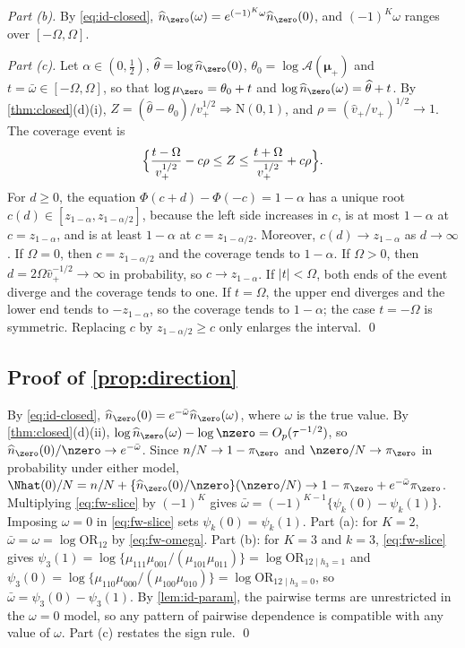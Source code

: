 \emph{Part (b).} By \eqref{eq:id-closed}, $\widehat n_{\zero}(\omega)=e^{(-1)^K\omega}\widehat n_{\zero}(0)$, and $(-1)^K\omega$ ranges over $[-\Omega,\Omega]$.

\emph{Part (c).} Let $\alpha\in(0,\tfrac12)$, $\widehat\theta=\log\widehat n_{\zero}(0)$, $\theta_0=\log\mathcal A(\bm\mu_+)$ and $t=\bar\omega\in[-\Omega,\Omega]$, so that $\log\mu_{\zero}=\theta_0+t$ and $\log\widehat n_{\zero}(\omega)=\widehat\theta+t$. By \cref{thm:closed}(d)(i), $Z=(\widehat\theta-\theta_0)/v_+^{1/2}\Rightarrow\mathrm N(0,1)$, and $\rho=(\widehat v_+/v_+)^{1/2}\to1$. The coverage event is
\[
  \Bigl\{\frac{t-\Omega}{v_+^{1/2}}-c\rho\le Z\le\frac{t+\Omega}{v_+^{1/2}}+c\rho\Bigr\}.
\]
For $d\ge0$, the equation $\Phi(c+d)-\Phi(-c)=1-\alpha$ has a unique root $c(d)\in[z_{1-\alpha},z_{1-\alpha/2}]$, because the left side increases in $c$, is at most $1-\alpha$ at $c=z_{1-\alpha}$, and is at least $1-\alpha$ at $c=z_{1-\alpha/2}$. Moreover, $c(d)\to z_{1-\alpha}$ as $d\to\infty$. If $\Omega=0$, then $c=z_{1-\alpha/2}$ and the coverage tends to $1-\alpha$. If $\Omega>0$, then $d=2\Omega\widehat v_+^{-1/2}\to\infty$ in probability, so $c\to z_{1-\alpha}$. If $|t|<\Omega$, both ends of the event diverge and the coverage tends to one. If $t=\Omega$, the upper end diverges and the lower end tends to $-z_{1-\alpha}$, so the coverage tends to $1-\alpha$; the case $t=-\Omega$ is symmetric. Replacing $c$ by $z_{1-\alpha/2}\ge c$ only enlarges the interval. \qed

\subsection{Proof of \texorpdfstring{\cref{prop:direction}}{the direction-of-bias proposition}}\label{app:id-direction}

By \eqref{eq:id-closed}, $\widehat n_{\zero}(0)=e^{-\bar\omega}\widehat n_{\zero}(\omega)$, where $\omega$ is the true value. By \cref{thm:closed}(d)(ii), $\log\widehat n_{\zero}(\omega)-\log\nzero=O_p(\tau^{-1/2})$, so $\widehat n_{\zero}(0)/\nzero\to e^{-\bar\omega}$. Since $n/N\to1-\pi_{\zero}$ and $\nzero/N\to\pi_{\zero}$ in probability under either model,
$\Nhat(0)/N=n/N+\{\widehat n_{\zero}(0)/\nzero\}(\nzero/N)\to1-\pi_{\zero}+e^{-\bar\omega}\pi_{\zero}$.
Multiplying \eqref{eq:fw-slice} by $(-1)^K$ gives $\bar\omega=(-1)^{K-1}\{\psi_k(0)-\psi_k(1)\}$. Imposing $\omega=0$ in \eqref{eq:fw-slice} sets $\psi_k(0)=\psi_k(1)$. Part (a): for $K=2$, $\bar\omega=\omega=\log\mathrm{OR}_{12}$ by \eqref{eq:fw-omega}. Part (b): for $K=3$ and $k=3$, \eqref{eq:fw-slice} gives $\psi_3(1)=\log\{\mu_{111}\mu_{001}/(\mu_{101}\mu_{011})\}=\log\mathrm{OR}_{12\mid h_3=1}$ and $\psi_3(0)=\log\{\mu_{110}\mu_{000}/(\mu_{100}\mu_{010})\}=\log\mathrm{OR}_{12\mid h_3=0}$, so $\bar\omega=\psi_3(0)-\psi_3(1)$. By \cref{lem:id-param}, the pairwise terms are unrestricted in the $\omega=0$ model, so any pattern of pairwise dependence is compatible with any value of $\omega$. Part (c) restates the sign rule. \qed

